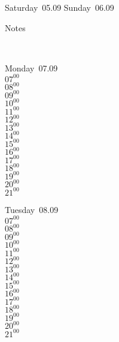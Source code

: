 \documentclass[11pt,a4paper]{book}\usepackage[]{graphicx}\usepackage[]{color}
\begin{document}
{{{{{{{{{{\begin{tcolorbox}
\end{tcolorbox} 
\begin{tcolorbox}[height=(\textheight-10mm)/6]
Saturday~05.09
\tcblower
Sunday~06.09
\end{tcolorbox} %
\begin{tcolorbox}[height=(\textheight-10mm)/6,sidebyside=false]
Notes
\end{tcolorbox}
\clearpage
\vspace{2 mm}\\
\begin{tcolorbox}
Monday~07.09\\
{ 
  $07^{00}$\\
$08^{00}$\\
$09^{00}$\\
$10^{00}$\\
$11^{00}$\\
$12^{00}$\\
$13^{00}$\\
$14^{00}$\\
$15^{00}$\\
$16^{00}$\\
$17^{00}$\\
$18^{00}$\\
$19^{00}$\\
$20^{00}$\\
$21^{00}$}\\

\end{tcolorbox}
\begin{tcolorbox}
Tuesday~08.09\\
{ 
  $07^{00}$\\
$08^{00}$\\
$09^{00}$\\
$10^{00}$\\
$11^{00}$\\
$12^{00}$\\
$13^{00}$\\
$14^{00}$\\
$15^{00}$\\
$16^{00}$\\
$17^{00}$\\
$18^{00}$\\
$19^{00}$\\
$20^{00}$\\
$21^{00}$}\\


\end{tcolorbox}}}}}}}}}}}
\end{document}
